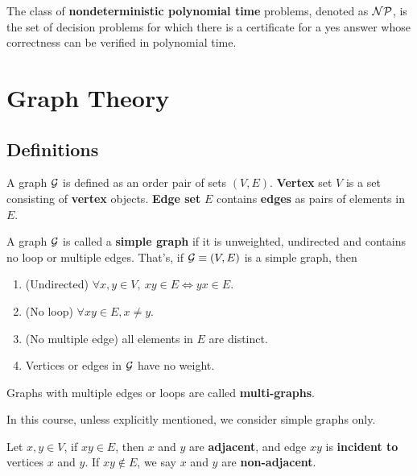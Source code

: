 \documentclass{article}
\begin{document}
			\begin{definition}
				The class of \textbf{nondeterministic polynomial time} problems, denoted as $\mathcal{{NP}}$, is the set of decision problems for which there is a certificate for a yes answer whose correctness can be verified in polynomial time.
			\end{definition}
	
	\section{Graph Theory}
		\subsection{Definitions}
		\begin{definition}
			A graph $\mathcal{{G}}$ is defined as an order pair of sets $(V, E)$. \textbf{Vertex} set $V$ is a set consisting of \textbf{vertex} objects. \textbf{Edge set} $E$ contains \textbf{edges} as pairs of elements in $E$.
		\end{definition}
		
		\begin{definition}
			A graph $\mathcal{{G}}$ is called a \textbf{simple graph} if it is unweighted, undirected and contains no loop or multiple edges. That's, if $\mathcal{{G}} \equiv (V, E)$ is a simple graph, then
			\begin{enumerate}
				\item (Undirected) $\forall x, y \in V,\ xy \in E \iff yx \in E$.
				\item (No loop) $\forall xy \in E, x \neq y$.
				\item (No multiple edge) all elements in $E$ are distinct.
				\item Vertices or edges in $\mathcal{{G}}$ have no weight.
			\end{enumerate}
			Graphs with multiple edges or loops are called \textbf{multi-graphs}.
		\end{definition}
		
		\begin{remark}
			In this course, unless explicitly mentioned, we consider simple graphs only.
		\end{remark}
		
		\begin{definition}
			Let $x, y \in V$, if $xy \in E$, then $x$ and $y$ are \textbf{adjacent}, and edge $xy$ is \textbf{incident to} vertices $x$ and $y$. If $xy \notin E$, we say $x$ and $y$ are \textbf{non-adjacent}.
		\end{definition}
		
\end{document}
